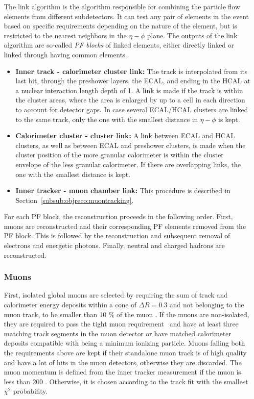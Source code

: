 The link algorithm is the algorithm responsible for combining the particle flow elements from different subdetectors.
It can test any pair of elements in the event based on specific requirements depending on the nature of the element, but is restricted to the nearest neighbors in the $\eta-\phi$ plane.
The outputs of the link algorithm are so-called \textit{PF blocks} of linked elements, either directly linked or linked through having common elements.
\begin{itemize}
  \item \textbf{Inner track - calorimeter cluster link:} The track is interpolated from its last hit, through the preshower layers, the ECAL, and ending in the HCAL at a nuclear interaction length depth of 1. A link is made if the track is within the cluster areas, where the area is enlarged by up to a cell in each direction to account for detector gaps. In case several ECAL/HCAL clusters are linked to the same track, only the one with the smallest distance in $\eta-\phi$ is kept.

\item \textbf{Calorimeter cluster - cluster link:} A link between ECAL and HCAL clusters, as well as between ECAL and preshower clusters,
is made when the cluster position of the more granular calorimeter is within the cluster envelope of the less granular calorimeter. If there are overlapping links, the one with the smallest distance is kept.

\item \textbf{Inner tracker - muon chamber link:} This procedure is described in Section~\ref{subsub:objreco:muontracking}.
\end{itemize}

\noindent For each PF block, the reconstruction proceeds in the following order. First, muons are reconstructed and their corresponding PF elements removed from the PF block. This is followed by the reconstruction and subsequent removal of electrons and energetic photons. Finally, neutral and charged hadrons are reconstructed.

\subsubsection{Muons}
\label{sec:objreco:muons}
First, isolated global muons are selected by requiring the sum of track \PT and calorimeter energy deposits within a cone of $\Delta R = 0.3$ and not belonging to the muon track, to be smaller than 10 \% of the muon \PT.
If the muons are non-isolated, they are required to pass the tight muon requirement~\cite{1748-0221-7-10-P10002} and have at least three matching track segments in the muon detector or have matched calorimeter deposits compatible with being a minimum ionizing particle.
Muons failing both the requirements above are kept if their standalone muon track is of high quality and have a lot of hits in the muon detectors, otherwise they are discarded.
The muon momentum is defined from the inner tracker measurement if the muon \PT is less than 200 \GeV. Otherwise, it is chosen according to the track fit with the smallest $\chi^2$ probability. \newline

